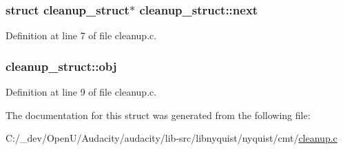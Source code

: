 \subsubsection[{\texorpdfstring{next}{next}}]{\setlength{\rightskip}{0pt plus 5cm}struct {\bf cleanup\+\_\+struct}$\ast$ cleanup\+\_\+struct\+::next}\hypertarget{structcleanup__struct_a809f60f4b467a62b16a474d8179f4b91}{}\label{structcleanup__struct_a809f60f4b467a62b16a474d8179f4b91}


Definition at line 7 of file cleanup.\+c.

\subsubsection[{\texorpdfstring{obj}{obj}}]{ cleanup\+\_\+struct\+::obj}\hypertarget{structcleanup__struct_ad56a9deebffa16a2b41055e42c379436}{}\label{structcleanup__struct_ad56a9deebffa16a2b41055e42c379436}


Definition at line 9 of file cleanup.\+c.



The documentation for this struct was generated from the following file\+:\begin{DoxyCompactItemize}
\item 
C\+:/\+\_\+dev/\+Open\+U/\+Audacity/audacity/lib-\/src/libnyquist/nyquist/cmt/\hyperlink{cleanup_8c}{cleanup.\+c}\end{DoxyCompactItemize}
